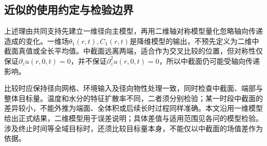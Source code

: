 \subsection{近似的使用约定与检验边界}
上述理由共同支持先建立一维径向主模型，再用二维轴对称模型量化忽略轴向传递造成的变化。一维场$\theta_1(r,t),C_1(r,t)$是降维模型的输出，不预先定义为二维中截面真值或全长平均值。中截面远离两端，适合作为交叉比较的位置，但对称性仅保证$\partial_z u(r,0,t)=0$，并不保证$\partial_z^2u(r,0,t)=0$，所以中截面仍可能受轴向传递影响。

比较时应保持径向网格、环境输入及径向物性处理一致，同时检查中截面、端部与整体目标量。温度和水分的特征扩散率不同，二者须分别检验；某一时段中截面的差异较小，不能外推为端面、全体积或后续长时过程同样准确。本文沿用一维模型给出正式结果，二维模型用于误差说明；具体差值与适用范围见各问的模型检验。涉及终止时间等全域目标时，还须比较目标量本身，不能仅以中截面的场值差作为依据。
